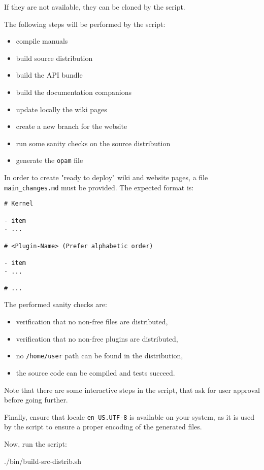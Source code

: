 If they are not available, they can be cloned by the script.

The following steps will be performed by the script:

\begin{itemize}
  \item compile manuals
  \item build source distribution
  \item build the API bundle
  \item build the documentation companions
  \item update locally the wiki pages
  \item create a new branch for the website
  \item run some sanity checks on the source distribution
  \item generate the \texttt{opam} file
\end{itemize}

In order to create "ready to deploy" wiki and website pages, a file \texttt{main\_changes.md}
must be provided. The expected format is:

\begin{lstlisting}
# Kernel

- item
- ...

# <Plugin-Name> (Prefer alphabetic order)

- item
- ...

# ...

\end{lstlisting}

The performed sanity checks are:

\begin{itemize}
  \item verification that no non-free files are distributed,
  \item verification that no non-free plugins are distributed,
  \item no \texttt{/home/user} path can be found in the distribution,
  \item the source code can be compiled and tests succeed.
\end{itemize}

Note that there are some interactive steps in the script, that ask for user
approval before going further.

Finally, ensure that locale \verb+en_US.UTF-8+ is available on your system,
as it is used by the script to ensure a proper encoding of the generated files.

Now, run the script:
\begin{shell}
./bin/build-src-distrib.sh
\end{shell}

